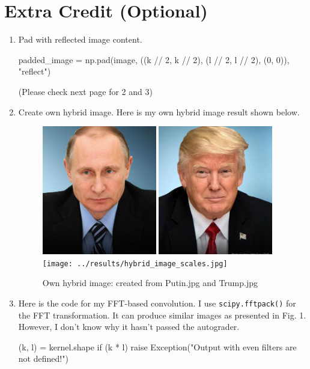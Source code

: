\section*{Extra Credit (Optional)}
\begin{enumerate}
    \item Pad with reflected image content.
        \begin{python}
padded_image = np.pad(image, ((k // 2, k // 2), (l // 2, l // 2), (0, 0)), "reflect")
        \end{python}
    (Please check next page for 2 and 3)
    \newpage
    \item Create own hybrid image. Here is my own hybrid image result shown below.
    \begin{figure}[htbp]
        \centering
        \includegraphics[width=5cm]{../data/Putin.jpg}
        \includegraphics[width=5cm]{../data/Trump.jpg}
        \texttt{[image: ../results/hybrid\_image\_scales.jpg]}
        \caption{Own hybrid image: created from Putin.jpg and Trump.jpg}
    \end{figure}

    \item Here is the code for my FFT-based convolution. I use \verb|scipy.fftpack()| for the FFT transformation. It can produce similar images as presented in Fig. 1. However, I don't know why it hasn't passed the autograder.
        \begin{python}
(k, l) = kernel.shape
if (k * l) %
    raise Exception("Output with even filters are not defined!")


\end{python}
\end{enumerate}
